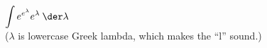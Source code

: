 $\displaystyle \int e^{e^\lambda}e^\lambda\:\der \lambda$\\
($\lambda$ is lowercase Greek lambda, which makes the ``l'' sound.)  \answercheck
